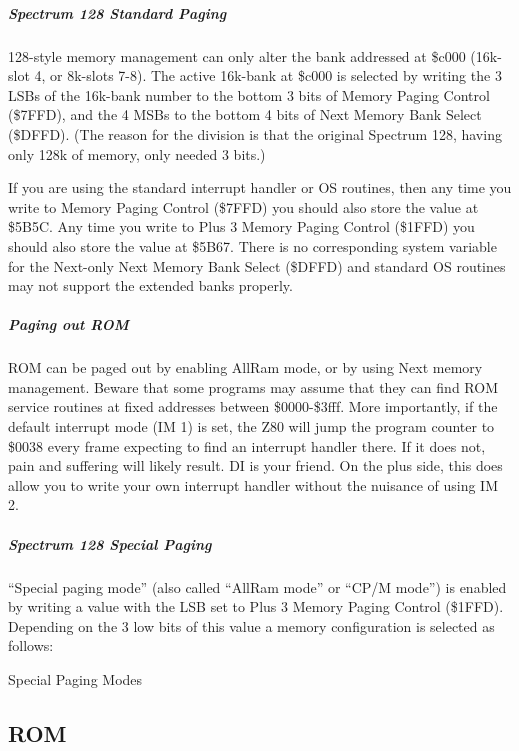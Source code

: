 



\subparagraph{Spectrum 128 Standard Paging}

128-style memory management can only alter the bank addressed at
\$c000 (16k-slot 4, or 8k-slots 7-8). The active 16k-bank at \$c000 is
selected by writing the 3 LSBs of the 16k-bank number to the bottom 3
bits of Memory Paging Control (\$7FFD), and the 4 MSBs to the bottom 4
bits of Next Memory Bank Select (\$DFFD). (The reason for the division
is that the original Spectrum 128, having only 128k of memory, only
needed 3 bits.)

If you are using the standard interrupt handler or OS routines, then
any time you write to Memory Paging Control (\$7FFD) you should also
store the value at \$5B5C. Any time you write to Plus 3 Memory Paging
Control (\$1FFD) you should also store the value at \$5B67. There is
no corresponding system variable for the Next-only Next Memory Bank
Select (\$DFFD) and standard OS routines may not support the extended
banks properly.

\subparagraph{Paging out ROM}

ROM can be paged out by enabling AllRam mode, or by using Next memory
management. Beware that some programs may assume that they can find
ROM service routines at fixed addresses between \$0000-\$3fff. More
importantly, if the default interrupt mode (IM 1) is set, the Z80 will
jump the program counter to \$0038 every frame expecting to find an
interrupt handler there. If it does not, pain and suffering will
likely result. DI is your friend. On the plus side, this does allow
you to write your own interrupt handler without the nuisance of using
IM 2.

\subparagraph{Spectrum 128 Special Paging}

``Special paging mode'' (also called ``AllRam mode'' or ``CP/M mode'')
is enabled by writing a value with the LSB set to Plus 3 Memory Paging
Control (\$1FFD). Depending on the 3 low bits of this value a memory
configuration is selected as follows:

\begin{table}[ht]\centering
  \caption{Special Paging Modes}
\end{table}

\subsection{ROM}

